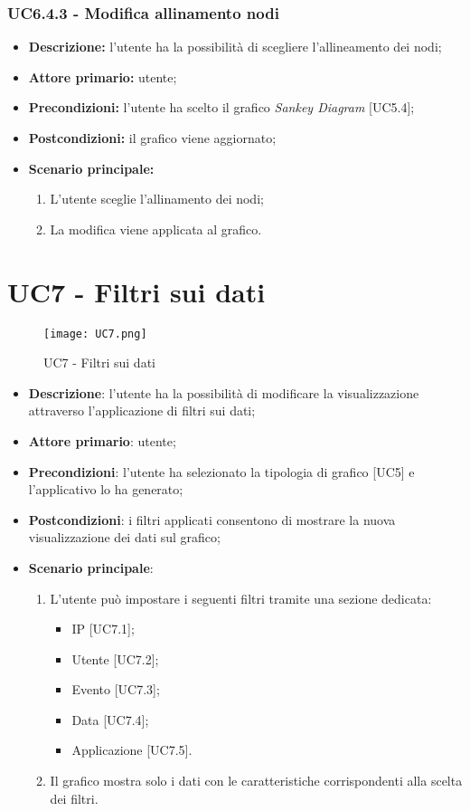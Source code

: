   \subsubsection{UC6.4.3 - Modifica allinamento nodi}
  \begin{itemize}
    \item \textbf{Descrizione:} l'utente ha la possibilità di scegliere l'allineamento dei nodi;
    \item \textbf{Attore primario:} utente;
    \item \textbf{Precondizioni:} l’utente ha scelto il grafico \textit{Sankey Diagram} [UC5.4];
    \item \textbf{Postcondizioni:} il grafico viene aggiornato;
    \item \textbf{Scenario principale:}
     \begin{enumerate}
      \item L'utente sceglie l'allinamento dei nodi;
            \item La modifica viene applicata al grafico.
    \end{enumerate}
  \end{itemize}

\section{UC7 - Filtri sui dati}
\begin{figure}[H]
  \centering
  \texttt{[image: UC7.png]}
  \caption{UC7 - Filtri sui dati}
\end{figure}

\begin{itemize}
  \item \textbf{Descrizione}: l'utente ha la possibilità di modificare la visualizzazione attraverso l'applicazione di filtri sui dati;
  \item \textbf{Attore primario}: utente;
  \item \textbf{Precondizioni}: l'utente ha selezionato la tipologia di grafico [UC5] e l'applicativo lo ha generato;
  \item \textbf{Postcondizioni}: i filtri applicati consentono di mostrare la nuova visualizzazione dei dati sul grafico;
  \item \textbf{Scenario principale}:
    \begin{enumerate}
      \item L'utente può impostare i seguenti filtri tramite una sezione dedicata:
        \begin{itemize}
          \item IP [UC7.1];
          \item Utente [UC7.2];
          \item Evento [UC7.3];
          \item Data [UC7.4];
          \item Applicazione [UC7.5].
        \end{itemize}
      \item Il grafico mostra solo i dati con le caratteristiche corrispondenti alla scelta dei filtri.
    \end{enumerate}
\end{itemize}

